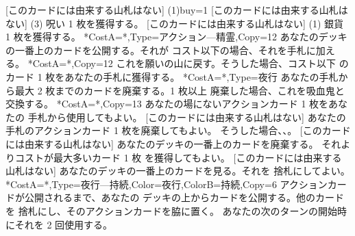 \documentclass{waku}
\begin{document}
[このカードには由来する山札はない]{
	\Vanilla(1){buy=1}
}
[このカードには由来する山札はない]{
	\Vanilla(3){}
	呪い 1 枚を獲得する。
}
[このカードには由来する山札はない]{
	\Vanilla(1){}
	銀貨 1 枚を獲得する。
}
*{CostA=*,Type=アクション—精霊,Copy=12}{
	あなたのデッキの一番上のカードを公開する。それが
	コスト以下の場合、それを手札に加える。
}
*{CostA=*,Copy=12}{
	これを願いの山に戻す。そうした場合、コスト以下
	のカード 1 枚をあなたの手札に獲得する。
}
*{CostA=*,Type=夜行}{
	あなたの手札から最大 2 枚までのカードを廃棄する。1 枚以上
	廃棄した場合、これを吸血鬼と交換する。
}
*{CostA=*,Copy=13}{
	あなたの場にないアクションカード 1 枚をあなたの
	手札から使用してもよい。
}
[このカードには由来する山札はない]{
	あなたの手札のアクションカード 1 枚を廃棄してもよい。
	そうした場合、、。
}
[このカードには由来する山札はない]{
	あなたのデッキの一番上のカードを廃棄する。
	それよりコストが最大多いカード 1 枚
	を獲得してもよい。
}
[このカードには由来する山札はない]{
	あなたのデッキの一番上のカードを見る。それを
	捨札にしてよい。
}
*{CostA=*,Type=夜行—持続,Color=夜行,ColorB=持続,Copy=6}{
	アクションカードが公開されるまで、あなたの
	デッキの上からカードを公開する。他のカードを
	捨札にし、そのアクションカードを脇に置く。
	あなたの次のターンの開始時にそれを 2 回使用する。
}
\end{document}
